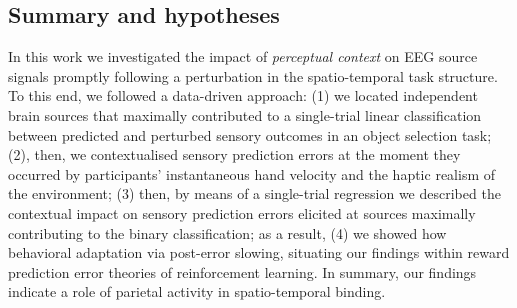 \subsection{Summary and hypotheses}
In this work we investigated the impact of \textit{perceptual context} on EEG source signals promptly following a perturbation in the spatio-temporal task structure. To this end, we followed a data-driven approach: (1) we located independent brain sources that maximally contributed to a single-trial linear classification between predicted and perturbed sensory outcomes in an object selection task; (2), then, we contextualised sensory prediction errors at the moment they occurred by participants' instantaneous hand velocity and the haptic realism of the environment; (3) then, by means of a single-trial regression we described the contextual impact on sensory prediction errors elicited at sources maximally contributing to the binary classification; as a result, (4) we showed how behavioral adaptation via post-error slowing, situating our findings within reward prediction error theories of reinforcement learning. In summary, our findings indicate a role of parietal activity in spatio-temporal binding.




